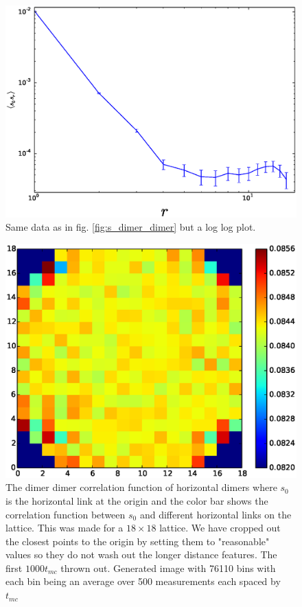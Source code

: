 \documentclass[aps,floatfix,11pt]{revtex4-1}
\begin{document}
\begin{figure}[h]
    \centering
    \includegraphics[width=8.5 cm]{s_dimer_dimer_cor_loglog}
    \caption{Same data as in fig. \ref{fig:s_dimer_dimer} but a log log plot.
    \label{fig:s_dimer_dimer_loglog}}
\end{figure}


\begin{figure}[h]
    \centering
    \includegraphics[width=8.5 cm]{full_lat_dmr_dmr_cor_str_dmr_mdl}
    \caption{The dimer dimer correlation function of horizontal dimers where $s_0$ is the
        horizontal link at the origin and the color bar shows the correlation function between $s_0$
        and different
        horizontal links on the lattice. This was made for a $18\times18$
        lattice. We have cropped out the closest points to the origin by setting them to 
        "reasonable" values so they do not wash out the longer distance features. The first $1000t_{mc}$ thrown out. Generated image with 76110 bins with each bin being
    an average over 500 measurements each spaced by $t_{mc}$ \label{}}
\end{figure}
\end{document}
